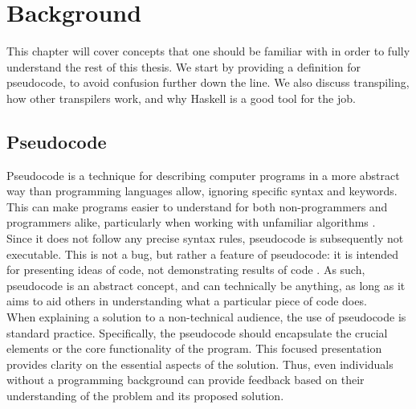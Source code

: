 \chapter{Background} %




This chapter will cover concepts that one should be familiar with in order to fully understand the rest of this thesis. We start by providing a definition for pseudocode, to avoid confusion further down the line. We also discuss transpiling, how other transpilers work, and why Haskell is a good tool for the job.

\section{Pseudocode}

Pseudocode is a technique for describing computer programs in a more abstract way than programming languages allow, ignoring specific syntax and keywords. This can make programs easier to understand for both non-programmers and programmers alike, particularly when working with unfamiliar algorithms \cite{LinfoAlgorithmsIntro2007}. \hfill \\

Since it does not follow any precise syntax rules, pseudocode is subsequently not executable. This is not a bug, but rather a feature of pseudocode: it is intended for presenting ideas of code, not demonstrating results of code \cite{LogicsofSpecificationLanguages}. As such, pseudocode is an abstract concept, and can technically be anything, as long as it aims to aid others in understanding what a particular piece of code does. \hfill \\

When explaining a solution to a non-technical audience, the use of pseudocode is standard practice. Specifically, the pseudocode should encapsulate the crucial elements or the core functionality of the program. This focused presentation provides clarity on the essential aspects of the solution. Thus, even individuals without a programming background can provide feedback based on their understanding of the problem and its proposed solution. \hfill \\

